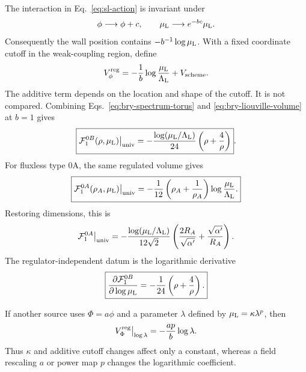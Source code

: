 \documentclass[11pt]{article}
\newcommand{\ap}{\alpha'}
\begin{document}
The interaction in Eq.~\eqref{eq:sl-action} is invariant under
\begin{equation}
 \phi\longrightarrow\phi+c,
 \qquad
 \mu_{\rm L}\longrightarrow e^{-bc}\mu_{\rm L}.
 \label{eq:liouville-shift}
\end{equation}
Consequently the wall position contains
$-b^{-1}\log\mu_{\rm L}$.  With a fixed coordinate cutoff in the
weak-coupling region, define
\begin{equation}
 V_\phi^{\rm reg}
 =-\frac1b\log\frac{\mu_{\rm L}}{\Lambda_{\rm L}}
 +V_{\rm scheme}.
 \label{eq:bry-liouville-volume}
\end{equation}
The additive term depends on the location and shape of the cutoff.  It is
not compared.  Combining Eqs.~\eqref{eq:bry-spectrum-torus} and
\eqref{eq:bry-liouville-volume} at $b=1$ gives
\begin{equation}
 \boxed{
 \mathcal F^{0B}_1(\rho,\mu_{\rm L})\big|_{\rm univ}
 =-\frac{\log(\mu_{\rm L}/\Lambda_{\rm L})}{24}
 \left(\rho+\frac4\rho\right)}.
 \label{eq:torus-anchor}
\end{equation}
For fluxless type 0A, the same regulated volume gives
\begin{equation}
 \boxed{
 \mathcal F^{0A}_1(\rho_A,\mu_{\rm L})\big|_{\rm univ}
 =-\frac1{12}\left(\rho_A+\frac1{\rho_A}\right)
 \log\frac{\mu_{\rm L}}{\Lambda_{\rm L}}.}
 \label{eq:torus-anchor-0a}
\end{equation}
Restoring dimensions, this is
\begin{equation}
 \mathcal F^{0A}_1\big|_{\rm univ}
 =-\frac{\log(\mu_{\rm L}/\Lambda_{\rm L})}{12\sqrt2}
 \left(\frac{2R_A}{\sqrt{\ap}}+\frac{\sqrt{\ap}}{R_A}\right).
 \label{eq:torus-anchor-0a-dimensional}
\end{equation}
The regulator-independent datum is the logarithmic derivative
\begin{equation}
 \boxed{
 \frac{\partial\mathcal F^{0B}_1}
 {\partial\log\mu_{\rm L}}
 =-\frac1{24}\left(\rho+\frac4\rho\right).}
 \label{eq:torus-log-derivative}
\end{equation}

If another source uses $\Phi=a\phi$ and a parameter $\lambda$ defined by
$\mu_{\rm L}=\kappa\lambda^p$, then
\begin{equation}
 V_\Phi^{\rm reg}\big|_{\log\lambda}
 =-\frac{ap}{b}\log\lambda.
 \label{eq:volume-translation}
\end{equation}
Thus $\kappa$ and additive cutoff changes affect only a constant, whereas a
field rescaling $a$ or power map $p$ changes the logarithmic coefficient.
\end{document}
